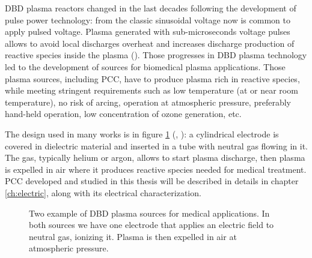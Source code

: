 DBD plasma reactors changed in the last decades following the development of pulse power technology: from the classic sinusoidal voltage now is common to apply pulsed voltage. Plasma generated with sub-microseconds voltage pulses allows to avoid local discharges overheat and increases discharge production of reactive species inside the plasma (\cite{SHAO2009215}). Those progresses in DBD plasma technology led to the development of sources for biomedical plasma applications. Those plasma sources, including PCC, have to produce plasma rich in reactive species, while meeting stringent requirements such as low temperature (at or near room temperature), no risk of arcing, operation at atmospheric pressure, preferably hand-held operation, low concentration of ozone generation, etc.

The design used in many works is in figure \ref{fig:DBDmed} (\cite{Stoffels_2006}, \cite{doi:10.1063/1.2045549}): a cylindrical electrode is covered in dielectric material and inserted in a tube with neutral gas flowing in it. The gas, typically helium or argon, allows to start plasma discharge, then plasma is expelled in air where it produces reactive species needed for medical treatment. PCC developed and studied in this thesis will be described in details in chapter \ref{ch:electric}, along with its electrical characterization.
\begin{figure}
 \centering
 \hfill
 \caption{Two example of DBD plasma sources for medical applications. In both sources we have one electrode that applies an electric field to neutral gas, ionizing it. Plasma is then expelled in air at atmospheric pressure.}
 \label{fig:DBDmed}
\end{figure}


